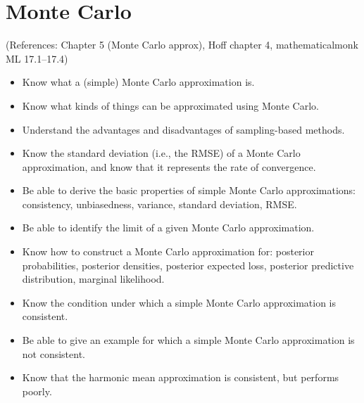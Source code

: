 \documentclass[12pt]{article}
\begin{document}
\section{Monte Carlo}
(References: Chapter 5 (Monte Carlo approx), Hoff chapter 4, mathematicalmonk ML 17.1--17.4)
\begin{itemize}
\setlength\itemsep{0em}
\item Know what a (simple) Monte Carlo approximation is.
\item Know what kinds of things can be approximated using Monte Carlo.
\item Understand the advantages and disadvantages of sampling-based methods.
\item Know the standard deviation (i.e., the RMSE) of a Monte Carlo approximation, and know that it represents the rate of convergence.
\item Be able to derive the basic properties of simple Monte Carlo approximations: consistency, unbiasedness, variance, standard deviation, RMSE.
\item Be able to identify the limit of a given Monte Carlo approximation.
\item Know how to construct a Monte Carlo approximation for: posterior probabilities, posterior densities, posterior expected loss, posterior predictive distribution, marginal likelihood.
\item Know the condition under which a simple Monte Carlo approximation is consistent.
\item Be able to give an example for which a simple Monte Carlo approximation is not consistent.
\item Know that the harmonic mean approximation is consistent, but performs poorly.
\end{itemize}
\end{document}
